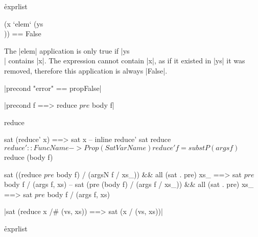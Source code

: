 \h{exprlist}\begin{code}
(x `elem` (ys \\ [x])) == False
\end{code}

The |elem| application is only true if |ys \\ [x]| contains |x|. The expression cannot contain |x|, as if it existed in |ys| it was removed, therefore this application is always |False|.


{|precond "error" == propFalse|}


{|precond f ==> reduce $ pre $ body f|}



\ignore\begin{code}
reduce

sat (reduce' x) ==> sat x
    -- inline reduce'
sat reduce $
reduce' :: FuncName -> Prop (Sat VarName)
reduce' f = substP (args f) $ reduce (body f)




sat ((reduce $ pre $ body f) / (argsN f / xs_)) && all (sat . pre) xs_ ==> sat $ pre $ body f / (args f, xs)
    -- 
sat (pre (body f) / (args f / xs_)) && all (sat . pre) xs_ ==> sat $ pre $ body f / (args f, xs)
\end{code}






{|sat (reduce x /# (vs, xs)) ==> sat (x / (vs, xs))|}

\h{exprlist}

\ignore{}

